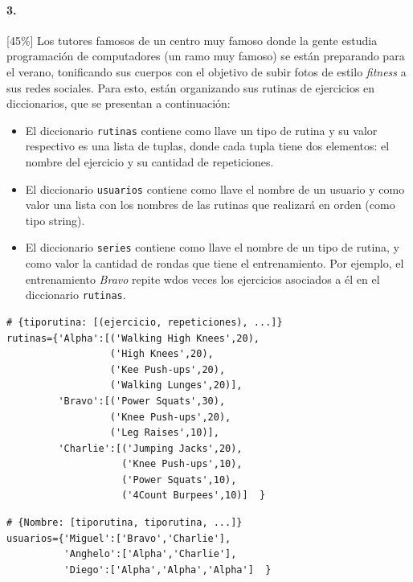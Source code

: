 \paragraph{3.} 
[45\%] Los tutores famosos de un centro muy famoso donde la gente estudia programación de computadores (un ramo muy famoso) se están preparando para el verano, tonificando sus cuerpos con el objetivo de subir fotos de estilo \textit{fitness} a sus redes sociales. Para esto, están organizando sus rutinas de ejercicios en diccionarios, que se presentan a continuación:

\begin{itemize}
    \item El diccionario \texttt{rutinas} contiene como llave un tipo de rutina y su valor respectivo es una lista de tuplas, donde cada tupla tiene dos elementos: el nombre del ejercicio y su cantidad de repeticiones.
    
    \item El diccionario \texttt{usuarios} contiene como llave el nombre de un usuario y como valor una lista con los nombres de las rutinas que realizará en orden (como tipo string).
    
    \item El diccionario \texttt{series} contiene como llave el nombre de un tipo de rutina, y como valor la cantidad de rondas que tiene el entrenamiento. Por ejemplo, el entrenamiento \textit{Bravo} repite wdos veces los ejercicios asociados a él en el diccionario \texttt{rutinas}.
\end{itemize}

\begin{lstlisting}[style=consola]
# {tiporutina: [(ejercicio, repeticiones), ...]}
rutinas={'Alpha':[('Walking High Knees',20),
                  ('High Knees',20),
                  ('Kee Push-ups',20),
                  ('Walking Lunges',20)],
         'Bravo':[('Power Squats',30),
                  ('Knee Push-ups',20),
                  ('Leg Raises',10)],
         'Charlie':[('Jumping Jacks',20),
                    ('Knee Push-ups',10),
                    ('Power Squats',10),
                    ('4Count Burpees',10)]  }
\end{lstlisting}

\begin{lstlisting}[style=consola]
# {Nombre: [tiporutina, tiporutina, ...]}
usuarios={'Miguel':['Bravo','Charlie'],
          'Anghelo':['Alpha','Charlie'],
          'Diego':['Alpha','Alpha','Alpha']  }
\end{lstlisting}

